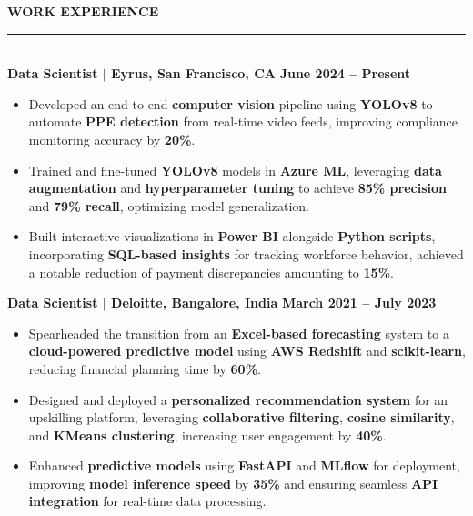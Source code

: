 \documentclass{article}
\begin{document}
\noindent \textbf{{WORK EXPERIENCE}} \vspace{-8pt} \\
\rule{\linewidth}{0.5pt} \\
\noindent \textbf{Data Scientist $\mid$ Eyrus, San Francisco, CA} \hfill \textbf{June 2024 -- Present}
\begin{itemize}[noitemsep, nolistsep, leftmargin=*]
    \item Developed an end-to-end \textbf{computer vision} pipeline using \textbf{YOLOv8} to automate \textbf{PPE detection} from real-time video feeds, improving compliance monitoring accuracy by \textbf{20\%}.
    \item Trained and fine-tuned \textbf{YOLOv8} models in \textbf{Azure ML}, leveraging \textbf{data augmentation} and \textbf{hyperparameter tuning} to achieve \textbf{85\% precision} and \textbf{79\% recall}, optimizing model generalization.
    \item Built interactive visualizations in \textbf{Power BI} alongside \textbf{Python scripts}, incorporating \textbf{SQL-based insights} for tracking workforce behavior, achieved a notable reduction of payment discrepancies amounting to \textbf{15\%}.
\end{itemize}

\vspace{1mm}
\noindent \textbf{Data Scientist $\mid$ Deloitte, Bangalore, India} \hfill \textbf{March 2021 -- July 2023}
\begin{itemize}[noitemsep, nolistsep, leftmargin=*]
    \item Spearheaded the transition from an \textbf{Excel-based forecasting} system to a \textbf{cloud-powered predictive model} using \textbf{AWS Redshift} and \textbf{scikit-learn}, reducing financial planning time by \textbf{60\%}.
    \item Designed and deployed a \textbf{personalized recommendation system} for an upskilling platform, leveraging \textbf{collaborative filtering}, \textbf{cosine similarity}, and \textbf{KMeans clustering}, increasing user engagement by \textbf{40\%}.
    \item Enhanced \textbf{predictive models} using \textbf{FastAPI} and \textbf{MLflow} for deployment, improving \textbf{model inference speed} by \textbf{35\%} and ensuring seamless \textbf{API integration} for real-time data processing.
\end{itemize}
\end{document}
